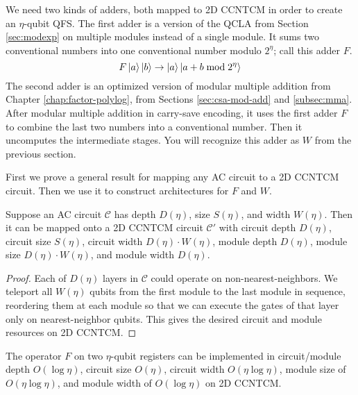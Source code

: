 We need two kinds of adders, both mapped to \textsf{2D CCNTCM} in order to
create an $\eta$-qubit QFS.
The first adder is a version of the QCLA from Section \ref{sec:modexp}
on multiple modules instead of a single module. It sums two
conventional numbers into one conventional number modulo $2^{\eta}$;
call this adder $F$.
%
\begin{equation}
F\left\vert{a}\right\rangle\left\vert{b}\right\rangle \rightarrow \left\vert{a}\right\rangle\left\vert{a+b \bmod 2^{\eta}}\right\rangle
\end{equation}
%
The second adder is an optimized version of modular multiple addition
from
Chapter \ref{chap:factor-polylog},
from Sections \ref{sec:csa-mod-add} and \ref{subsec:mma}.
After modular multiple addition in carry-save encoding,
it uses the first adder $F$ to combine the last two numbers
into a conventional number. Then it uncomputes the intermediate stages.
You will recognize this adder as $W$ from the previous section.

First we prove a general result for mapping any \textsf{AC} circuit
to a \textsf{2D CCNTCM} circuit.
Then we use it to construct architectures for $F$ and $W$.

\begin{lemma}
Suppose an \textsf{AC} circuit $\mathcal{C}$ has
depth $D(\eta)$, size $S(\eta)$, and width $W(\eta)$. Then it can be mapped
onto a \textsf{2D CCNTCM} circuit $\mathcal{C'}$ with circuit depth
$D(\eta)$, circuit size $S(\eta)$, circuit width $D(\eta)\cdot W(\eta)$,
module depth $D(\eta)$, module size $D(\eta)\cdot W(\eta)$, and module width
$D(\eta)$.
\label{lem:ac-ccntcm}
\end{lemma}

\begin{proof}
Each of $D(\eta)$ layers in $\mathcal{C}$ could operate on non-nearest-neighbors.
We teleport all
$W(\eta)$ qubits from the first module to the last module in sequence,
reordering them at each module so that we can execute the gates of that
layer only on nearest-neighbor qubits.
This gives the desired circuit and module resources on
\textsf{2D CCNTCM}.
\end{proof}

\begin{lemma}
The operator $F$ on
two $\eta$-qubit registers can be
implemented in circuit/module depth $O(\log \eta)$, circuit size $O(\eta)$, 
circuit width $O(\eta\log \eta)$, module size of $O(\eta \log \eta)$, and
module width of $O(\log \eta)$ on
\textsf{2D CCNTCM}.
\label{lem:f}
\end{lemma}

